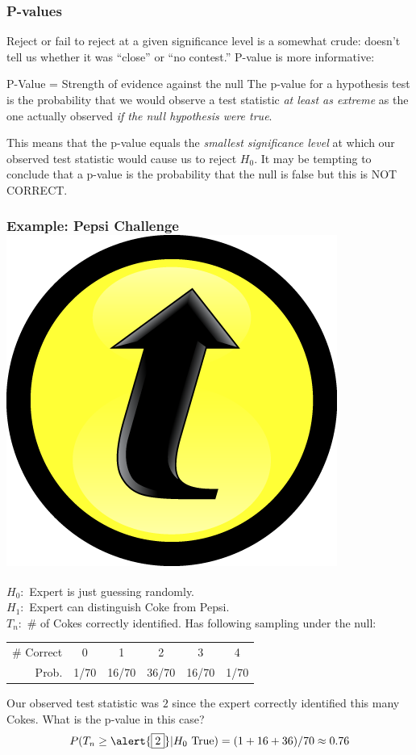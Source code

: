 \documentclass[handout]{beamer}
\begin{document}
\begin{frame}
\frametitle{P-values}
Reject or fail to reject at a given significance level is a somewhat crude: doesn't tell us whether it was ``close'' or ``no contest.'' P-value is more informative: \pause
	\begin{block}{P-Value = Strength of evidence against the null}
	The p-value for a hypothesis test is the probability that we would observe a test statistic \emph{at least as extreme} as the one actually observed \emph{if the null hypothesis were true}.
\end{block}
\pause
\vspace{1em}
\alert{This means that the p-value equals the \emph{smallest significance level} at which our observed test statistic would cause us to reject $H_0$. It may be tempting to conclude that a p-value is the probability that the null is false but this is NOT CORRECT.}
\end{frame}

\begin{frame}
\frametitle{Example: Pepsi Challenge \hfill \includegraphics[scale = 0.05]{./images/clicker}}
\footnotesize 
$H_0\colon$ Expert is just guessing randomly.\\
$H_1\colon$ Expert can distinguish Coke from Pepsi.\\
$T_n\colon$ \# of Cokes correctly identified. Has following sampling under the null:
		\begin{center}
		\begin{tabular}{rccccc}
		\hline \footnotesize
		\# Correct & 0 & 1 & 2 & 3 & 4\\
		Prob.&1/70 & 16/70 & 36/70 & 16/70 &1/70\\
		\hline
		\end{tabular}
	\end{center}
	\vspace{2em}
	\normalsize
	\alert{Our observed test statistic was $\boxed{2}$ since the expert correctly identified this many Cokes. What is the p-value in this case?}\pause
	\begin{eqnarray*}
		P(T_n \geq \alert{\boxed{2}}|H_0 \mbox{ True}) = (1 + 16 + 36)/70 \approx 0.76
	\end{eqnarray*}
\end{frame}

\end{document}
